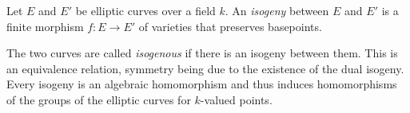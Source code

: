 \documentclass[12pt]{article}
\begin{document}
Let $E$ and $E'$ be elliptic curves over a field $k$.  An {\em isogeny} between $E$ and $E'$ is a finite morphism $f : E\to E'$ of varieties that preserves basepoints.

The two curves are called {\em isogenous} if there is an isogeny between them.  This is an equivalence relation, symmetry being due to the existence of the dual isogeny.  Every isogeny is an algebraic homomorphism and thus induces homomorphisms of the groups of the elliptic curves for $k$-valued points.
\end{document}
